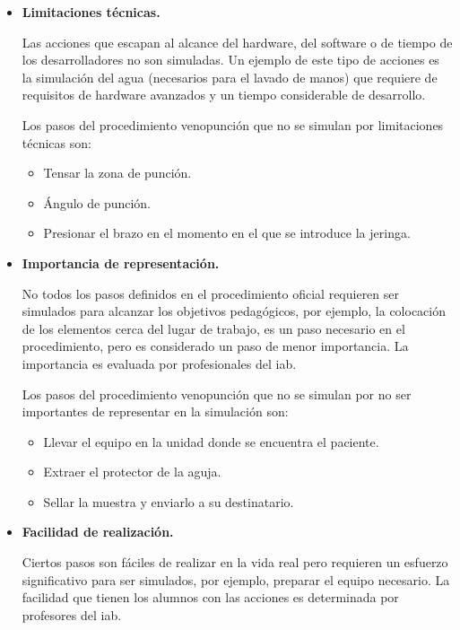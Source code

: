 \begin{itemize}
\item  \textbf{Limitaciones técnicas.} 
    
    Las acciones que escapan al alcance del hardware, del software o de tiempo
    de los desarrolladores no son simuladas. Un ejemplo de este tipo de acciones
    es la simulación del agua (necesarios para el lavado de manos) que requiere
    de requisitos de hardware avanzados y un tiempo considerable de desarrollo.
        
    Los pasos del procedimiento venopunción que no se simulan por
    limitaciones técnicas son:
    \begin{itemize}
        \item Tensar la zona de punción.
        \item Ángulo de punción.
        \item Presionar el brazo en el momento en el que se introduce la jeringa.
    \end{itemize}
    
    
\item \textbf{Importancia de representación.}

    No todos los pasos definidos en el procedimiento oficial requieren ser
    simulados para alcanzar los objetivos pedagógicos, por ejemplo, la colocación 
    de los elementos cerca del lugar de
    trabajo, es un paso necesario en el procedimiento, pero es considerado un
    paso de menor importancia. La importancia es evaluada por profesionales del \Gls{iab}.
    
    Los pasos del procedimiento venopunción que no se simulan por 
    no ser importantes de representar en la simulación son:
    \begin{itemize}
        \item Llevar el equipo en la unidad donde se encuentra el paciente.
        \item Extraer el protector de la aguja.
        \item Sellar la muestra y enviarlo a su destinatario.
    \end{itemize}
    
    
\item \textbf{Facilidad de realización.}

    Ciertos pasos son fáciles de realizar en la vida real pero requieren un
    esfuerzo significativo para ser simulados, por ejemplo, preparar el
    equipo necesario. La facilidad que tienen los alumnos con las acciones es 
    determinada por profesores del \Gls{iab}.
    

\end{itemize}
